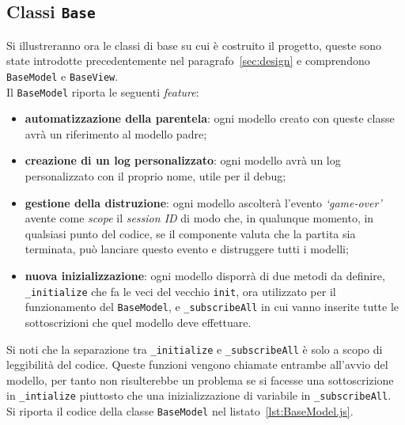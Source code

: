 \subsection{Classi \texttt{Base}}
Si illustreranno ora le classi di base su cui è costruito il progetto, queste sono state introdotte precedentemente nel paragrafo~\ref{sec:design} e comprendono \texttt{BaseModel} e \texttt{BaseView}.\\
Il \texttt{BaseModel} riporta le seguenti \textit{feature}:
\begin{itemize}
    \item \textbf{automatizzazione della parentela}: ogni modello creato con queste classe avrà un riferimento al modello padre;
    \item \textbf{creazione di un log personalizzato}: ogni modello avrà un log personalizzato con il proprio nome, utile per il debug;
    \item \textbf{gestione della distruzione}: ogni modello ascolterà l'evento \textit{`game-over'} avente come \textit{scope} il \textit{session ID} di modo che, in qualunque momento, in qualsiasi
    punto del codice, se il componente valuta che la partita sia terminata, può lanciare questo evento e distruggere tutti i modelli;
    \item \textbf{nuova inizializzazione}: ogni modello disporrà di due metodi da definire, \texttt{\_initialize} che fa le veci del vecchio \texttt{init}, ora utilizzato per il funzionamento
    del \texttt{BaseModel}, e \texttt{\_subscribeAll} in cui vanno inserite tutte le sottoscrizioni che quel modello deve effettuare.
\end{itemize}
Si noti che la separazione tra \texttt{\_initialize} e \texttt{\_subscribeAll} è solo a scopo di leggibilità del codice. Queste funzioni vengono chiamate entrambe all'avvio del modello, per
tanto non risulterebbe un problema se si facesse una sottoscrizione in \texttt{\_intialize} piuttosto che una inizializzazione di variabile in \texttt{\_subscribeAll}.\\
Si riporta il codice della classe \texttt{BaseModel} nel listato~\ref{lst:BaseModel.js}.

